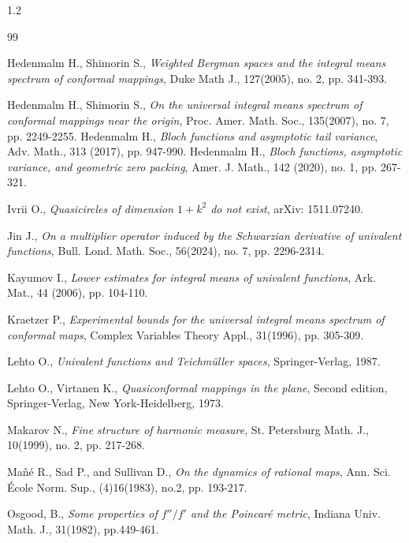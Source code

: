\documentclass[11pt]{amsart}
\theoremstyle{remark}
\theoremstyle{claim}
\theoremstyle{definition}
\theoremstyle{problem}
\theoremstyle{conjecture}
\theoremstyle{question}
\numberwithin{equation}{section}
\begin{document}
\begin{spacing}{1.2}
\begin{thebibliography}{99}

Hedenmalm H., Shimorin S., {\em Weighted Bergman spaces and the integral means spectrum of conformal mappings},  Duke Math J., 127(2005), no. 2, pp. 341-393.

Hedenmalm H., Shimorin S., {\em On the universal integral means spectrum of conformal mappings near the origin}, Proc. Amer. Math. Soc., 135(2007), no. 7, pp. 2249-2255. 
Hedenmalm H., {\em Bloch functions and asymptotic tail variance}, Adv. Math., 313 (2017), pp. 947-990. 
Hedenmalm H., {\em Bloch functions, asymptotic variance, and geometric zero packing}, Amer. J. Math., 142 (2020), no. 1, pp. 267-321.  

Ivrii O., {\em Quasicircles of dimension $1+k^2$ do not exist}, arXiv: 1511.07240.


Jin J., {\em On a multiplier operator induced by the Schwarzian derivative of univalent functions}, Bull. Lond. Math. Soc., 56(2024), no. 7, pp. 2296-2314.

Kayumov I., {\em Lower estimates for integral means of univalent functions}, Ark. Mat., 44 (2006), pp. 104-110.

 Kraetzer P., {\em Experimental bounds for the universal integral means spectrum of conformal maps}, Complex Variables Theory Appl., 31(1996), pp. 305-309.

Lehto O., {\em Univalent functions and Teichm\"uller spaces}, Springer-Verlag, 1987.

Lehto O., Virtanen K., {\em Quasiconformal mappings in the plane}, Second edition, Springer-Verlag, New York-Heidelberg, 1973.

Makarov N., {\em Fine structure of harmonic measure},  St. Petersburg Math. J.,  10(1999), no. 2, pp. 217-268.

Ma\~n\' e R., Sad P., and Sullivan D., {\em On the dynamics of rational maps},  Ann. Sci. \'Ecole Norm. Sup.,  (4)16(1983), no.2, pp. 193-217.

Osgood, B., {\em Some properties of $f''/f'$ and the Poincaré metric}, Indiana Univ. Math. J., 31(1982), pp.449-461.


\end{thebibliography}
\end{spacing}
\end{document}
